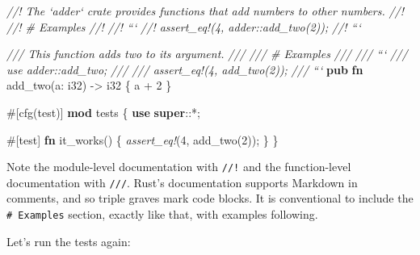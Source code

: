 \documentclass[a4paper,]{book}
\newenvironment{Shaded}{\begin{snugshade}}{\end{snugshade}}
\newcommand{\KeywordTok}[1]{\textcolor[rgb]{0.13,0.29,0.53}{\textbf{{#1}}}}
\newcommand{\DataTypeTok}[1]{\textcolor[rgb]{0.13,0.29,0.53}{{#1}}}
\newcommand{\DecValTok}[1]{\textcolor[rgb]{0.00,0.00,0.81}{{#1}}}
\newcommand{\CommentTok}[1]{\textcolor[rgb]{0.56,0.35,0.01}{\textit{{#1}}}}
\newcommand{\PreprocessorTok}[1]{\textcolor[rgb]{0.56,0.35,0.01}{\textit{{#1}}}}
\newcommand{\AttributeTok}[1]{\textcolor[rgb]{0.77,0.63,0.00}{{#1}}}
\newcommand{\NormalTok}[1]{{#1}}
\begin{document}
\begin{Shaded}
\begin{Highlighting}[]
\CommentTok{//! The `adder` crate provides functions that add numbers to other numbers.}
\CommentTok{//!}
\CommentTok{//! # Examples}
\CommentTok{//!}
\CommentTok{//! ```}
\CommentTok{//! assert_eq!(4, adder::add_two(2));}
\CommentTok{//! ```}

\CommentTok{/// This function adds two to its argument.}
\CommentTok{///}
\CommentTok{/// # Examples}
\CommentTok{///}
\CommentTok{/// ```}
\CommentTok{/// use adder::add_two;}
\CommentTok{///}
\CommentTok{/// assert_eq!(4, add_two(2));}
\CommentTok{/// ```}
\KeywordTok{pub} \KeywordTok{fn} \NormalTok{add_two(a: }\DataTypeTok{i32}\NormalTok{) -> }\DataTypeTok{i32} \NormalTok{\{}
    \NormalTok{a + }\DecValTok{2}
\NormalTok{\}}

\AttributeTok{#[}\NormalTok{cfg}\AttributeTok{(}\NormalTok{test}\AttributeTok{)]}
\KeywordTok{mod} \NormalTok{tests \{}
    \KeywordTok{use} \KeywordTok{super}\NormalTok{::*;}

    \AttributeTok{#[}\NormalTok{test}\AttributeTok{]}
    \KeywordTok{fn} \NormalTok{it_works() \{}
        \PreprocessorTok{assert_eq!}\NormalTok{(}\DecValTok{4}\NormalTok{, add_two(}\DecValTok{2}\NormalTok{));}
    \NormalTok{\}}
\NormalTok{\}}
\end{Highlighting}
\end{Shaded}

Note the module-level documentation with \texttt{//!} and the
function-level documentation with \texttt{///}. Rust's documentation
supports Markdown in comments, and so triple graves mark code blocks. It
is conventional to include the \texttt{\#\ Examples} section, exactly
like that, with examples following.

Let's run the tests again:
\end{document}
